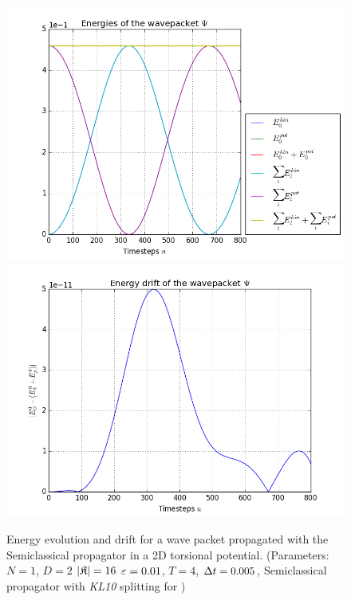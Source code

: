 \begin{figure}[ht]
	\centering
	\includegraphics[width=.8\textwidth]{figures/torsional_2D_Semiclassical_energies.png}
	\includegraphics[width=.8\textwidth]{figures/torsional_2D_Semiclassical_drift.png}
	\caption{Energy evolution and drift for a wave packet propagated with the Semiclassical propagator in a 2D torsional potential.
	(Parameters: $N=1$, $D=2$ $|\mathfrak{K}|=16$ $\varepsilon=0.01$, $T=4$, $\Delta t=0.005$, Semiclassical propagator with \emph{KL10} splitting for )}
	\label{fig:energy_Semiclassical_2D}
\end{figure}


